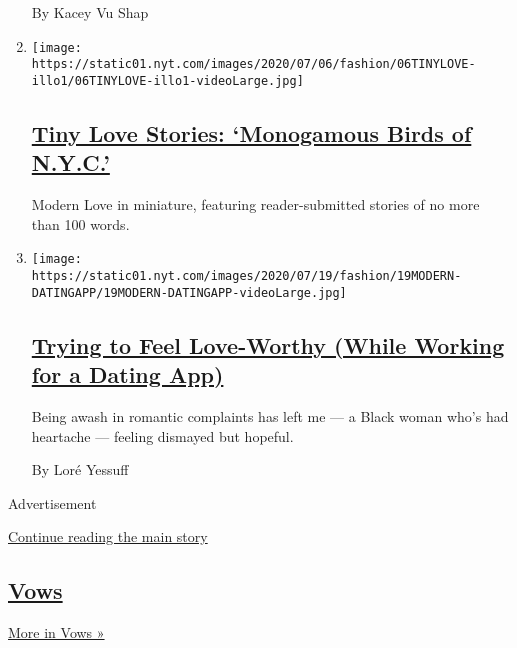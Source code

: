 \begin{enumerate}
  By Kacey Vu Shap
\item
  \texttt{[image: https://static01.nyt.com/images/2020/07/06/fashion/06TINYLOVE-illo1/06TINYLOVE-illo1-videoLarge.jpg]}

  \hypertarget{tiny-love-stories-monogamous-birds-of-nyc}{%
  \subsection{\texorpdfstring{\href{/2020/07/21/style/tiny-modern-love-stories-coronavirus-monogamous-birds-of-nyc.html}{Tiny
  Love Stories: `Monogamous Birds of
  N.Y.C.'}}{Tiny Love Stories: `Monogamous Birds of N.Y.C.'}}\label{tiny-love-stories-monogamous-birds-of-nyc}}

  Modern Love in miniature, featuring reader-submitted stories of no
  more than 100 words.
\item
  \texttt{[image: https://static01.nyt.com/images/2020/07/19/fashion/19MODERN-DATINGAPP/19MODERN-DATINGAPP-videoLarge.jpg]}

  \hypertarget{trying-to-feel-love-worthy-while-working-for-a-dating-app}{%
  \subsection{\texorpdfstring{\href{/2020/07/17/style/modern-love-feel-love-worthy-working-for-dating-app.html}{Trying
  to Feel Love-Worthy (While Working for a Dating
  App)}}{Trying to Feel Love-Worthy (While Working for a Dating App)}}\label{trying-to-feel-love-worthy-while-working-for-a-dating-app}}

  Being awash in romantic complaints has left me --- a Black woman who's
  had heartache --- feeling dismayed but hopeful.

  By Loré Yessuff
\end{enumerate}

Advertisement

\protect\hyperlink{after-mid2}{Continue reading the main story}

\hypertarget{vows-3}{%
\subsection{\texorpdfstring{\href{/column/vows}{Vows}}{Vows}}\label{vows-3}}

\href{/column/vows}{More in Vows »}


